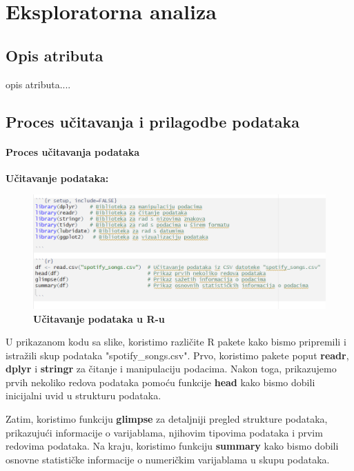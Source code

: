 \chapter{Eksploratorna analiza}

\section{Opis atributa}
opis atributa....

\section{Proces učitavanja i prilagodbe podataka}

	\subsubsection{Proces učitavanja podataka}
	
		\textbf{Učitavanje podataka:}
		\begin{figure}[H]
			\centering
			\includegraphics[scale=0.9]{slike/ucitavanje.png}
			\caption{\textbf{Učitavanje podataka u R-u}}
		\end{figure}
		
		U prikazanom kodu sa slike, koristimo različite R pakete kako bismo pripremili i istražili skup podataka "spotify\_songs.csv". Prvo, koristimo pakete poput \textbf{readr}, \textbf{dplyr} i \textbf{stringr} za čitanje i manipulaciju podacima. Nakon toga, prikazujemo prvih nekoliko redova podataka pomoću funkcije \textbf{head} kako bismo dobili inicijalni uvid u strukturu podataka.
		
		Zatim, koristimo funkciju \textbf{glimpse} za detaljniji pregled strukture podataka, prikazujući informacije o varijablama, njihovim tipovima podataka i prvim redovima podataka. Na kraju, koristimo funkciju \textbf{summary} kako bismo dobili osnovne statističke informacije o numeričkim varijablama u skupu podataka.
		
